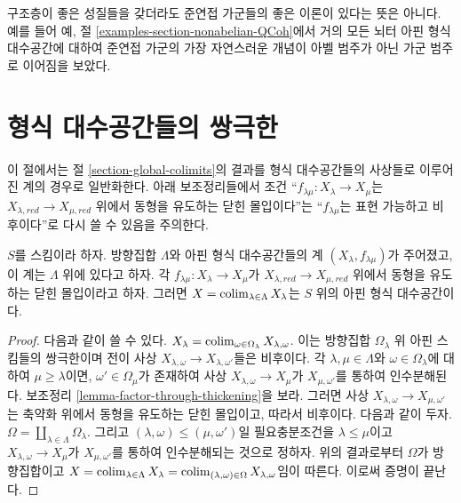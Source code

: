 \begin{remark}
\label{remark-bad-quasi-coherent}
구조층이 좋은 성질들을 갖더라도 준연접 가군들의 좋은 이론이 있다는
뜻은 아니다. 예를 들어 예, 절
\ref{examples-section-nonabelian-QCoh}에서 거의 모든 뇌터 아핀
형식 대수공간에 대하여 준연접 가군의 가장 자연스러운 개념이 아벨
범주가 아닌 가군 범주로 이어짐을 보았다.
\end{remark}

\section{형식 대수공간들의 쌍극한}
\label{section-colimits-of-formal}

\noindent
이 절에서는 절 \ref{section-global-colimits}의 결과를 형식
대수공간들의 사상들로 이루어진 계의 경우로 일반화한다.
아래 보조정리들에서 조건
“$f_{\lambda \mu} : X_\lambda \to X_\mu$는
$X_{\lambda, red} \to X_{\mu, red}$ 위에서 동형을 유도하는 닫힌
몰입이다”는 “$f_{\lambda \mu}$는 표현 가능하고 비후이다”로
다시 쓸 수 있음을 주의한다.

\begin{lemma}
\label{lemma-colimit-affine-formal}
$S$를 스킴이라 하자. 방향집합 $\Lambda$와 아핀 형식 대수공간들의 계
$(X_\lambda, f_{\lambda \mu})$가 주어졌고, 이 계는 $\Lambda$ 위에 있다고 하자.
각 $f_{\lambda \mu} : X_\lambda \to X_\mu$가
$X_{\lambda, red} \to X_{\mu, red}$ 위에서 동형을 유도하는 닫힌
몰입이라고 하자. 그러면
$X = \mathop{\mathrm{colim}}\nolimits_{\lambda \in \Lambda} X_\lambda$는 $S$ 위의 아핀 형식
대수공간이다.
\end{lemma}

\begin{proof}
다음과 같이 쓸 수 있다.
$X_\lambda = \mathop{\mathrm{colim}}\nolimits_{\omega \in \Omega_\lambda} X_{\lambda, \omega}$.
이는 방향집합 $\Omega_\lambda$ 위 아핀 스킴들의 쌍극한이며 전이 사상
$X_{\lambda, \omega} \to X_{\lambda, \omega'}$들은 비후이다.
각 $\lambda, \mu \in \Lambda$와 $\omega \in \Omega_\lambda$에
대하여 $\mu \geq \lambda$이면, $\omega' \in \Omega_\mu$가
존재하여 사상 $X_{\lambda, \omega} \to X_\mu$가
$X_{\mu, \omega'}$를 통하여 인수분해된다. 보조정리
\ref{lemma-factor-through-thickening}을 보라. 그러면 사상
$X_{\lambda, \omega} \to X_{\mu, \omega'}$는 축약화 위에서 동형을
유도하는 닫힌 몰입이고, 따라서 비후이다. 다음과 같이 두자.
$\Omega = \coprod_{\lambda \in \Lambda} \Omega_\lambda$.
그리고 $(\lambda, \omega) \leq (\mu, \omega')$일 필요충분조건을
$\lambda \leq \mu$이고 $X_{\lambda, \omega} \to X_\mu$가
$X_{\mu, \omega'}$를 통하여 인수분해되는 것으로 정하자.
위의 결과로부터 $\Omega$가 방향집합이고
$X = \mathop{\mathrm{colim}}\nolimits_{\lambda \in \Lambda} X_\lambda =
\mathop{\mathrm{colim}}\nolimits_{(\lambda, \omega) \in \Omega} X_{\lambda, \omega}$임이 따른다.
이로써 증명이 끝난다.
\end{proof}


